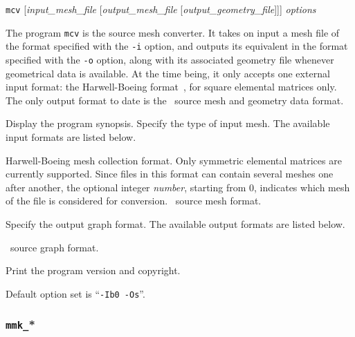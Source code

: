\begin{itemize}
\progsyn
\texttt{mcv} [{\it input\_mesh\_file} [{\it output\_mesh\_file} [{\it output\_geometry\_file}]]] {\it options}

\progdes
The program \texttt{mcv} is the source mesh converter. It takes on input a mesh
file of the format specified with the \texttt{-i} option, and outputs its
equivalent in the format specified with the \texttt{-o} option, along with its
associated geometry file whenever geometrical data is available.
At the time being, it only accepts one external input format: the
Harwell-Boeing format~\cite{dugrle92}, for square elemental matrices only.
The only output format to date is the \scotch\ source mesh and
geometry data format.

\progopt
\begin{itemize}
\iteme[\texttt{-h}]
Display the program synopsis.
Specify the type of input mesh.
The available input formats are listed below.
\begin{itemize}
\iteme[{\texttt{b}[{\it number}]}]
Harwell-Boeing mesh collection format. Only symmetric elemental matrices
are currently supported.
Since files in this format can contain several meshes one after another,
the optional integer {\it number}, starting
from $0$, indicates which mesh of the file is considered for conversion.
\iteme[\texttt{s}]
\scotch\ source mesh format.
\end{itemize}
Specify the output graph format. The available output formats are listed below.
\begin{itemize}
\iteme[\texttt{s}]
\scotch\ source graph format.
\end{itemize}
\iteme[\texttt{-V}]
Print the program version and copyright.
\end{itemize}

Default option set is ``\texttt{-Ib0 -Os}''.
\end{itemize}

\subsubsection{\texttt{mmk\_}*}

